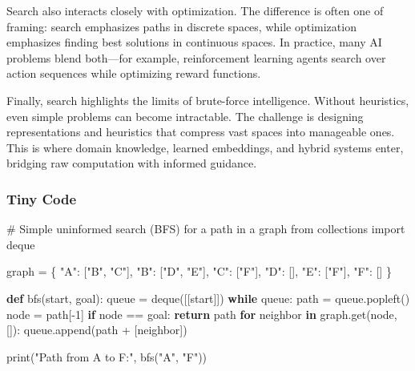 \documentclass[
  letterpaper,
  DIV=11,
  numbers=noendperiod]{scrreprt}
\newenvironment{Shaded}{\begin{snugshade}}{\end{snugshade}}
\newcommand{\BuiltInTok}[1]{\textcolor[rgb]{0.00,0.23,0.31}{#1}}
\newcommand{\CommentTok}[1]{\textcolor[rgb]{0.37,0.37,0.37}{#1}}
\newcommand{\ControlFlowTok}[1]{\textcolor[rgb]{0.00,0.23,0.31}{\textbf{#1}}}
\newcommand{\DecValTok}[1]{\textcolor[rgb]{0.68,0.00,0.00}{#1}}
\newcommand{\ImportTok}[1]{\textcolor[rgb]{0.00,0.46,0.62}{#1}}
\newcommand{\KeywordTok}[1]{\textcolor[rgb]{0.00,0.23,0.31}{\textbf{#1}}}
\newcommand{\NormalTok}[1]{\textcolor[rgb]{0.00,0.23,0.31}{#1}}
\newcommand{\OperatorTok}[1]{\textcolor[rgb]{0.37,0.37,0.37}{#1}}
\newcommand{\StringTok}[1]{\textcolor[rgb]{0.13,0.47,0.30}{#1}}
\begin{document}
Search also interacts closely with optimization. The difference is often
one of framing: search emphasizes paths in discrete spaces, while
optimization emphasizes finding best solutions in continuous spaces. In
practice, many AI problems blend both---for example, reinforcement
learning agents search over action sequences while optimizing reward
functions.

Finally, search highlights the limits of brute-force intelligence.
Without heuristics, even simple problems can become intractable. The
challenge is designing representations and heuristics that compress vast
spaces into manageable ones. This is where domain knowledge, learned
embeddings, and hybrid systems enter, bridging raw computation with
informed guidance.

\subsubsection{Tiny Code}\label{tiny-code-60}

\begin{Shaded}
\begin{Highlighting}[]
\CommentTok{\# Simple uninformed search (BFS) for a path in a graph}
\ImportTok{from}\NormalTok{ collections }\ImportTok{import}\NormalTok{ deque}

\NormalTok{graph }\OperatorTok{=}\NormalTok{ \{}
    \StringTok{"A"}\NormalTok{: [}\StringTok{"B"}\NormalTok{, }\StringTok{"C"}\NormalTok{],}
    \StringTok{"B"}\NormalTok{: [}\StringTok{"D"}\NormalTok{, }\StringTok{"E"}\NormalTok{],}
    \StringTok{"C"}\NormalTok{: [}\StringTok{"F"}\NormalTok{],}
    \StringTok{"D"}\NormalTok{: [], }\StringTok{"E"}\NormalTok{: [}\StringTok{"F"}\NormalTok{], }\StringTok{"F"}\NormalTok{: []}
\NormalTok{\}}

\KeywordTok{def}\NormalTok{ bfs(start, goal):}
\NormalTok{    queue }\OperatorTok{=}\NormalTok{ deque([[start]])}
    \ControlFlowTok{while}\NormalTok{ queue:}
\NormalTok{        path }\OperatorTok{=}\NormalTok{ queue.popleft()}
\NormalTok{        node }\OperatorTok{=}\NormalTok{ path[}\OperatorTok{{-}}\DecValTok{1}\NormalTok{]}
        \ControlFlowTok{if}\NormalTok{ node }\OperatorTok{==}\NormalTok{ goal:}
            \ControlFlowTok{return}\NormalTok{ path}
        \ControlFlowTok{for}\NormalTok{ neighbor }\KeywordTok{in}\NormalTok{ graph.get(node, []):}
\NormalTok{            queue.append(path }\OperatorTok{+}\NormalTok{ [neighbor])}

\BuiltInTok{print}\NormalTok{(}\StringTok{"Path from A to F:"}\NormalTok{, bfs(}\StringTok{"A"}\NormalTok{, }\StringTok{"F"}\NormalTok{))}
\end{Highlighting}
\end{Shaded}
\end{document}

